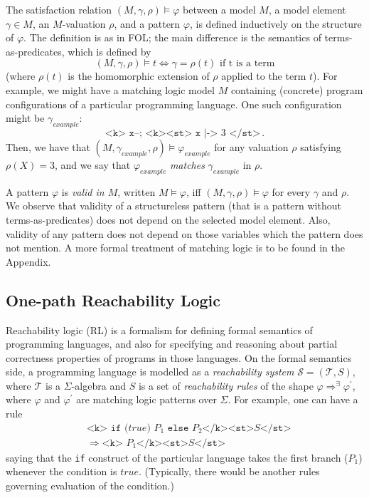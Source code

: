 The satisfaction relation $(M, \gamma, \rho) \vDash \varphi$ between a model $M$, a model element $\gamma \in M$,
an $M$-valuation $\rho$, and a pattern $\varphi$, is defined inductively on the structure of $\varphi$.
The definition is as in FOL; the main difference is the semantics of terms-as-predicates, which is defined by
\begin{equation*}
    (M, \gamma, \rho) \vDash t \iff \gamma = \rho(t) \text{ if t is a term}
\end{equation*}
(where $\rho(t)$ is the homomorphic extension of $\rho$ applied to the term $t$).
For example, we might have a matching logic model $M$ containing (concrete) program configurations
of a particular programming language.
One such configuration might be $\gamma_{\mathit{example}}$:
\begin{equation*}
    \texttt{<k> x--; <k><st> x} \texttt{ |-> } 3\texttt{ </st>} \, .
\end{equation*}
Then, we have that $(M, \gamma_{\mathit{example}}, \rho) \vDash \varphi_{\mathit{example}}$
for any valuation $\rho$ satisfying $\rho(X) = 3$, and we say that
$\varphi_{\mathit{example}}$ \emph{matches} $\gamma_{\mathit{example}}$ in $\rho$.


A pattern $\varphi$ is \emph{valid in $M$}, written $M \vDash \varphi$, iff $(M, \gamma, \rho) \vDash \varphi$
for every $\gamma$ and $\rho$.
We observe that validity of a structureless pattern (that is a pattern without terms-as-predicates) does not depend on the selected model element.
Also, validity of any pattern does not depend on those variables which the pattern does not mention.
A more formal treatment of matching logic is to be found in the Appendix.


\subsection{One-path Reachability Logic}
Reachability logic \cite{StefanescuCMMSR19,RosuS12oopsla} (RL) is a formalism for
defining formal semantics of programming languages,
and also for specifying and reasoning about partial correctness properties
of programs in those languages.
On the formal semantics side, a programming language is modelled as a \emph{reachability system}
$\mathcal{S} = (\mathcal{T}, S)$, where $\mathcal{T}$ is a $\Sigma$-algebra
and $S$ is a set of \emph{reachability rules} of the shape $\varphi \Rightarrow^\exists \varphi^\prime$,
where $\varphi$ and $\varphi^\prime$ are matching logic patterns over $\Sigma$.
For example, one can have a rule
\begin{equation}\label{eqn:ruleIfTrue}
    \begin{aligned}
    & \texttt{<k> if (} \mathit{true} \texttt{) }P_1\texttt{ else } P_2 \texttt{</k><st>} S \texttt{</st>} \\
    & \Rightarrow \texttt{<k> }P_1 \texttt{</k><st>} S \texttt{</st>}
    \end{aligned}
\end{equation}
saying that the \texttt{if} construct of the particular language takes the first branch ($P_1$)
whenever the condition is $\mathit{true}$.
(Typically, there would be another rules governing evaluation of the condition.)

